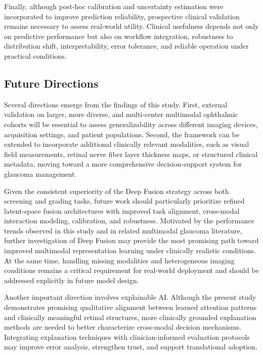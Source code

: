 \documentclass[preprint,12pt]{elsarticle}
\begin{document}
Finally, although post-hoc calibration and uncertainty estimation were incorporated to improve prediction reliability, prospective clinical validation remains necessary to assess real-world utility. Clinical usefulness depends not only on predictive performance but also on workflow integration, robustness to distribution shift, interpretability, error tolerance, and reliable operation under practical conditions.

\subsection{Future Directions}

Several directions emerge from the findings of this study. First, external validation on larger, more diverse, and multi-center multimodal ophthalmic cohorts will be essential to assess generalizability across different imaging devices, acquisition settings, and patient populations. Second, the framework can be extended to incorporate additional clinically relevant modalities, such as visual field measurements, retinal nerve fiber layer thickness maps, or structured clinical metadata, moving toward a more comprehensive decision-support system for glaucoma management.

Given the consistent superiority of the Deep Fusion strategy across both screening and grading tasks, future work should particularly prioritize refined latent-space fusion architectures with improved task alignment, cross-modal interaction modeling, calibration, and robustness. Motivated by the performance trends observed in this study and in related multimodal glaucoma literature, further investigation of Deep Fusion may provide the most promising path toward improved multimodal representation learning under clinically realistic conditions. At the same time, handling missing modalities and heterogeneous imaging conditions remains a critical requirement for real-world deployment and should be addressed explicitly in future model design.

Another important direction involves explainable AI. Although the present study demonstrates promising qualitative alignment between learned attention patterns and clinically meaningful retinal structures, more clinically grounded explanation methods are needed to better characterize cross-modal decision mechanisms. Integrating explanation techniques with clinician-informed evaluation protocols may improve error analysis, strengthen trust, and support translational adoption.
\end{document}
